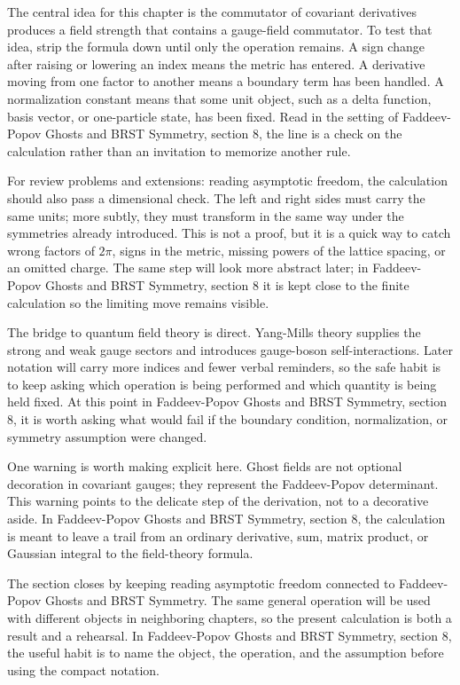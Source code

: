 The central idea for this chapter is the commutator of covariant derivatives produces a field strength that contains a gauge-field commutator.  To test that idea, strip the formula down until only the operation remains.  A sign change after raising or lowering an index means the metric has entered.  A derivative moving from one factor to another means a boundary term has been handled.  A normalization constant means that some unit object, such as a delta function, basis vector, or one-particle state, has been fixed.  Read in the setting of Faddeev-Popov Ghosts and BRST Symmetry, section 8, the line is a check on the calculation rather than an invitation to memorize another rule.

For review problems and extensions: reading asymptotic freedom, the calculation should also pass a dimensional check.  The left and right sides must carry the same units; more subtly, they must transform in the same way under the symmetries already introduced.  This is not a proof, but it is a quick way to catch wrong factors of \(2\pi\), signs in the metric, missing powers of the lattice spacing, or an omitted charge.  The same step will look more abstract later; in Faddeev-Popov Ghosts and BRST Symmetry, section 8 it is kept close to the finite calculation so the limiting move remains visible.

The bridge to quantum field theory is direct.  Yang-Mills theory supplies the strong and weak gauge sectors and introduces gauge-boson self-interactions.  Later notation will carry more indices and fewer verbal reminders, so the safe habit is to keep asking which operation is being performed and which quantity is being held fixed.  At this point in Faddeev-Popov Ghosts and BRST Symmetry, section 8, it is worth asking what would fail if the boundary condition, normalization, or symmetry assumption were changed.

One warning is worth making explicit here.  Ghost fields are not optional decoration in covariant gauges; they represent the Faddeev-Popov determinant.  This warning points to the delicate step of the derivation, not to a decorative aside.  In Faddeev-Popov Ghosts and BRST Symmetry, section 8, the calculation is meant to leave a trail from an ordinary derivative, sum, matrix product, or Gaussian integral to the field-theory formula.

The section closes by keeping reading asymptotic freedom connected to Faddeev-Popov Ghosts and BRST Symmetry.  The same general operation will be used with different objects in neighboring chapters, so the present calculation is both a result and a rehearsal.  In Faddeev-Popov Ghosts and BRST Symmetry, section 8, the useful habit is to name the object, the operation, and the assumption before using the compact notation.



